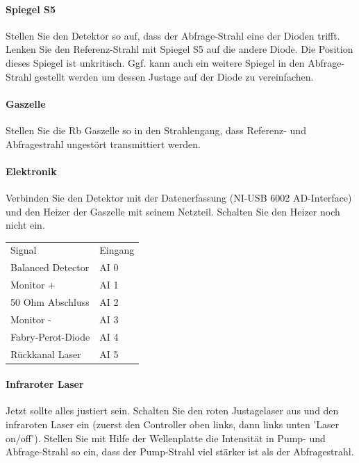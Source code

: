 \paragraph{Spiegel S5} Stellen Sie den Detektor so auf, dass der Abfrage-Strahl eine der Dioden trifft. Lenken Sie den Referenz-Strahl mit Spiegel S5 auf die andere Diode.
 Die Position dieses Spiegel ist unkritisch.  Ggf. kann auch ein weitere Spiegel in den Abfrage-Strahl gestellt werden um dessen Justage auf der Diode zu vereinfachen.

\paragraph{Gaszelle} Stellen Sie die Rb Gaszelle so in den Strahlengang, dass Referenz- und Abfragestrahl ungestört transmittiert werden.


\paragraph*{Elektronik} Verbinden Sie den Detektor  mit der Datenerfassung (NI-USB 6002 AD-Interface) und den Heizer der Gaszelle mit seinem Netzteil. Schalten Sie den Heizer noch nicht ein.

\begin{margintable}
    \begin{tabular}{ll}
        Signal & Eingang \\
        Balanced Detector & AI 0 \\
        Monitor + & AI 1 \\
        50 Ohm Abschluss & AI 2 \\
        Monitor - & AI 3 \\
        Fabry-Perot-Diode & AI 4 \\
        Rückkanal Laser & AI 5
    \end{tabular}
    \caption{Belegung der Datenerfassung}
\end{margintable}

\paragraph*{Infraroter Laser} Jetzt sollte alles justiert sein. Schalten Sie den roten Justagelaser aus und  den infraroten Laser ein (zuerst den Controller oben links, dann links unten 'Laser on/off'). Stellen Sie mit Hilfe der Wellenplatte die Intensität in Pump- und Abfrage-Strahl so ein, dass der Pump-Strahl viel stärker ist als der Abfragestrahl.



